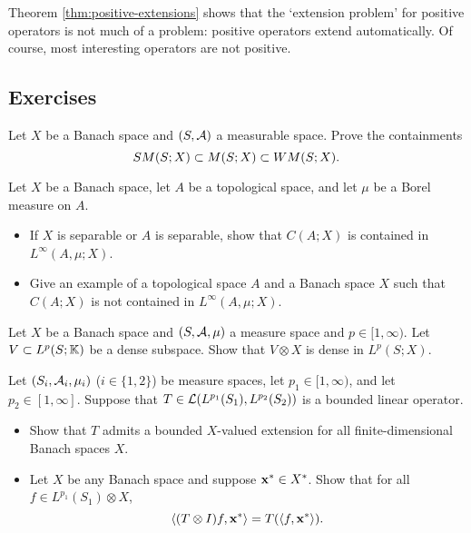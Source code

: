 Theorem \ref{thm:positive-extensions} shows that the `extension problem' for positive operators is not much of a problem: positive operators extend automatically.
Of course, most interesting operators are not positive.

\begin{example}
\end{example}



\subsection*{Exercises}

\begin{exercise}\label{ex:measurability-containments}
  Let $X$ be a Banach space and $(S,\mathcal{A})$ a measurable space.
  Prove the containments
  \begin{equation*}
    SM(S;X) \subset M(S;X) \subset WM(S;X).
  \end{equation*}
\end{exercise}

\begin{exercise}
  Let $X$ be a Banach space, let $A$ be a topological space, and let $\mu$ be a Borel measure on $A$.
  \begin{itemize}
  \item If $X$ is separable or $A$ is separable, show that $C(A;X)$ is contained in $L^\infty(A, \mu;X)$.
  \item Give an example of a topological space $A$ and a Banach space $X$ such that $C(A;X)$ is not contained in $L^\infty(A,\mu;X)$.
  \end{itemize}
\end{exercise}

\begin{exercise}\label{ex:general-density}
  Let $X$ be a Banach space and $(S,\mathcal{A},\mu)$ a measure space and $p \in [1,\infty)$.
  Let $V \subset L^p(S;\mathbb{K})$ be a dense subspace.
  Show that $V \otimes X$ is dense in $L^p(S;X)$.
\end{exercise}

\begin{exercise}\label{ex:tensor-extension-basic-props}
  Let $(S_i, \mathcal{A}_i, \mu_i)$ ($i \in \{1,2\}$) be measure spaces, let $p_1 \in [1,\infty)$, and let $p_2 \in [1,\infty]$.
  Suppose that $T \in \mathcal{L}(L^{p_1}(S_1), L^{p_2}(S_2))$ is a bounded linear operator.
  \begin{itemize}
  \item
    Show that $T$ admits a bounded $X$-valued extension for all finite-dimensional Banach spaces $X$.
  \item
    Let $X$ be any Banach space and suppose $\mathbf{x}^* \in X^*$.
    Show that for all $f \in L^{p_1}(S_1) \otimes X$,
    \begin{equation*}
      \langle (T \otimes I)f, \mathbf{x}^* \rangle = T(\langle f, \mathbf{x}^* \rangle).
    \end{equation*}
  \end{itemize}

\end{exercise}

